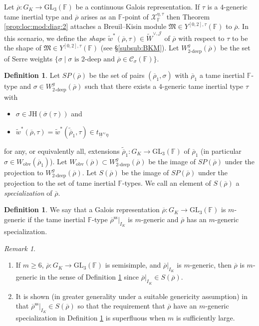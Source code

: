 \documentclass[oneside,a4paper,english, 11pt]{amsart}
\theoremstyle{plain}
\theoremstyle{plain}
\theoremstyle{plain}
\theoremstyle{plain}
\theoremstyle{plain}
\theoremstyle{plain}
\theoremstyle{definition}
\newtheorem{defn}[thm]{Definition}
\theoremstyle{definition}
\theoremstyle{definition}
\theoremstyle{remark}
\newtheorem{rmk}[thm]{Remark}
\numberwithin{equation}{section}
\newcommand{\F}{\mathbb{F}}
\newcommand{\fM}{\mathfrak{M}}
\newcommand{\cC}{\mathcal{C}}
\newcommand{\cJ}{\mathcal{J}}
\newcommand{\cX}{\mathcal{X}}
\newcommand{\GL}{\mathrm{GL}}
\newcommand{\semis}{\mathrm{ss}}
\newcommand{\un}[1]{\underline{#1}}
\newcommand{\tld}[1]{\widetilde{#1}}
\newcommand{\JH}{\mathrm{JH}}
\newcommand{\rhobar}{\overline{\rho}}
\newcommand{\ovl}[1]{\overline{#1}}
\newcommand{\ra}{\rightarrow}
\begin{document}
Let $\rhobar: G_K \ra \GL_3(\F)$ be a continuous Galois representation.
If $\tau$ is a $4$-generic tame inertial type and $\rhobar$ arises as an $\F$-point of $\cX^{\eta,\tau}_{\F}$ then Theorem \ref{prop:loc:mod:diag:2} attaches a Breuil--Kisin module $\fM\in Y^{[0,2],\tau}(\F)$ to $\rhobar$.
In this scenario, we define the \emph{shape $\tld{w}^*(\rhobar,\tau)\in \tld{W}^{\vee,\cJ}$} of $\rhobar$ with respect to $\tau$ to be the shape of $\fM\in Y^{[0,2],\tau}(\F)$ (see \S \ref{subsub:BKM}).
%
%
%
%
%
%
%
Let $W^g_{2\textrm{-deep}}(\rhobar)$ be the set of Serre weights $\{\sigma \mid \text{$\sigma$ is $2$-deep and $\rhobar \in \cC_\sigma(\F)$}\}$. 
%
%
%
%
%
%
\begin{defn}
Let $SP(\rhobar)$ be the set of pairs $(\rhobar_1,\sigma)$ with $\rhobar_1$ a tame inertial $\F$-type  and $\sigma \in W^g_{2\textrm{-deep}}(\rhobar)$ such that there exists a $4$-generic tame inertial type $\tau$ with
\begin{itemize}
\item $\sigma \in \JH(\ovl{\sigma}(\tau))$ and 
\item $\tld{w}^*(\rhobar,\tau) = \tld{w}^*(\tld{\rhobar}_1,\tau) \in t_{\un{W}^\vee \eta}$  
\end{itemize}
for any, or equivalently all, extensions $\tld{\rhobar}_1: G_K \ra \GL_3(\F)$ of $\rhobar_1$
(in particular $\sigma\in W_{\mathrm{obv}}(\rhobar_1)$).
Let $W_{\mathrm{obv}}(\rhobar) \subset W^g_{2\textrm{-deep}}(\rhobar)$ be the image of $SP(\rhobar)$ under the projection to $W^g_{2\textrm{-deep}}(\rhobar)$. 
Let $S(\rhobar)$ be the image of $SP(\rhobar)$ under the projection to the set of tame inertial $\F$-types. 
We call an element of $S(\rhobar)$ a \emph{specialization} of $\rhobar$. 
\end{defn}

\begin{defn}\label{defn:generic}
We say that a Galois representation $\rhobar: G_K \ra \GL_3(\F)$ is $m$-generic if the tame inertial $\F$-type $\rhobar^{\semis}|_{I_K}$ is $m$-generic and $\rhobar$ has an $m$-generic specialization. 
\end{defn}

\begin{rmk}
\begin{enumerate}
\item If $m\geq 6$, $\rhobar: G_K \ra \GL_3(\F)$ is semisimple, and
$\rhobar|_{I_K}$ is $m$-generic, then $\rhobar$ is $m$-generic in the sense of Definition \ref{defn:generic} since $\rhobar|_{I_K} \in S(\rhobar)$. 
%
\item It is shown (in greater generality under a suitable genericity assumption) in \cite{OBW} that $\rhobar^{\semis}|_{I_K} \in S(\rhobar)$ so that the requirement that $\rhobar$ have an $m$-generic specialization in Definition \ref{defn:generic} is superfluous when $m$ is sufficiently large. 
\end{enumerate}
\end{rmk}
\end{document}
